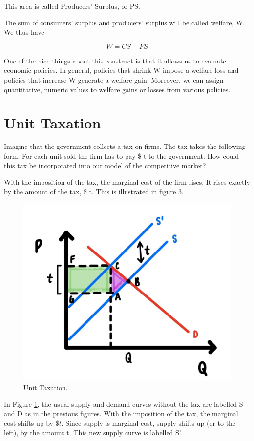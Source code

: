 \documentclass[
]{book}
\begin{document}
This area is called Producers' Surplus, or PS.

The sum of consumers' surplus and producers' surplus will be called welfare, W. We thus have

\[W = CS + PS\]

One of the nice things about this construct is that it allows us to evaluate economic policies. In general, policies that shrink W impose a welfare loss and policies that increase W generate a welfare gain. Moreover, we can assign quantitative, numeric values to welfare gains or losses from various policies.

\hypertarget{unit-taxation}{%
\section{Unit Taxation}\label{unit-taxation}}

Imagine that the government collects a tax on firms. The tax takes the following form: For each unit sold the firm has to pay \$ t to the government. How could this tax be incorporated into our model of the competitive market?

With the imposition of the tax, the marginal cost of the firm rises. It rises exactly by the amount of the tax, \$ t. This is illustrated in figure 3.

\begin{figure}

{\centering \includegraphics[width=0.5\linewidth]{img/ch5/fig3} 

}

\caption{Unit Taxation.}\label{fig:fig503}
\end{figure}

In Figure \ref{fig:fig503}, the usual supply and demand curves without the tax are labelled S and D as in the previous figures. With the imposition of the tax, the marginal cost shifts up by \(\$t\). Since supply is marginal cost, supply shifts up (or to the left), by the amount t. This new supply curve is labelled S'.
\end{document}
